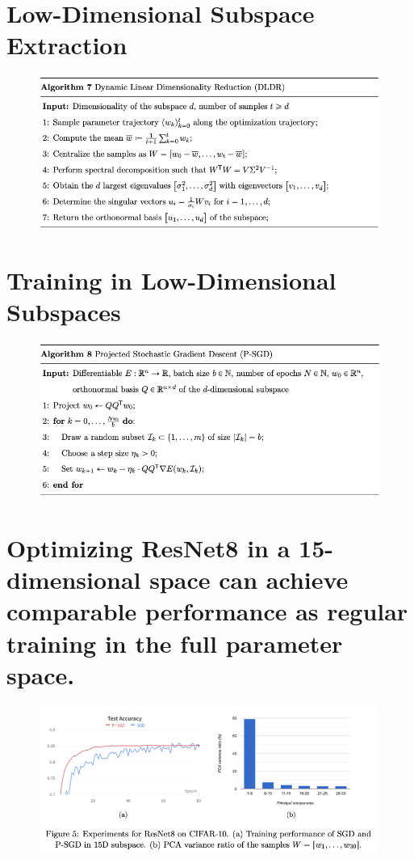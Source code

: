 \documentclass[t]{beamer}
\begin{document}
\section{Low-Dimensional Subspace Extraction}
\begin{frame}
\begin{figure}
\includegraphics[width=\textwidth]{dldr.png}
\end{figure}
\end{frame}


\section{Training in Low-Dimensional Subspaces}
\begin{frame}
\begin{figure}
\includegraphics[width=\textwidth]{p-sgd}
\end{figure}
\end{frame}


\section{Optimizing ResNet8 in a 15-dimensional space can achieve comparable performance as regular training in the full parameter space.}
\begin{frame}
\begin{figure}
\includegraphics[width=0.99\textwidth]{exp-1}
\end{figure}
\end{frame}
\end{document}
